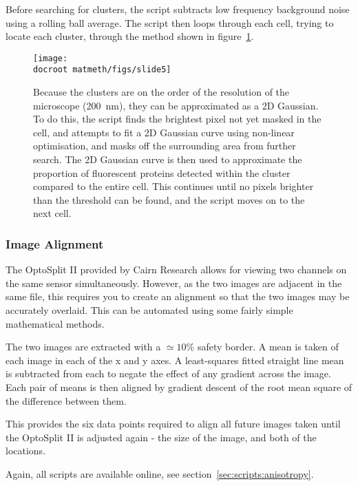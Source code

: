 \documentclass[../main.tex]{subfiles}
\begin{document}
Before searching for clusters, the script subtracts low frequency background noise using a rolling ball average. The script then loops through each cell, trying to locate each cluster, through the method shown in figure~\ref{fig:imageprocessing:clusterdetection}.

\begin{figure}[h!]
\begin{center}
\texttt{[image: \\docroot matmeth/figs/slide5]}
\caption{Because the clusters are on the order of the resolution of the microscope (\SI{200}{\nano\meter}), they can be approximated as a 2D Gaussian. To do this, the script finds the brightest pixel not yet masked in the cell, and attempts to fit a 2D Gaussian curve using non-linear optimisation, and masks off the surrounding area from further search. The 2D Gaussian curve is then used to approximate the proportion of fluorescent proteins detected within the cluster compared to the entire cell. This continues until no pixels brighter than the threshold can be found, and the script moves on to the next cell.}
\label{fig:imageprocessing:clusterdetection}
\end{center}
\end{figure}



\subsubsection{Image Alignment}

The OptoSplit II provided by Cairn Research allows for viewing two channels on the same sensor simultaneously. However, as the two images are adjacent in the same file, this requires you to create an alignment so that the two images may be accurately overlaid. This can be automated using some fairly simple mathematical methods.

The two images are extracted with a \(\simeq10\%\) safety border. A mean is taken of each image in each of the x and y axes. A least-squares fitted straight line mean is subtracted from each to negate the effect of any gradient across the image. Each pair of means is then aligned by gradient descent of the root mean square of the difference between them.

This provides the six data points required to align all future images taken until the OptoSplit II is adjusted again - the size of the image, and both of the locations.

Again, all scripts are available online, see section~\ref{sec:scripts:anisotropy}.
\end{document}
